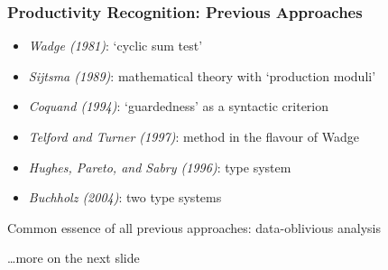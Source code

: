 \documentclass[10pt]{beamer}
\begin{document}
\begin{frame}%
  \frametitle{Productivity Recognition: Previous Approaches}

\begin{itemize}
  \item \emph{Wadge (1981)}: `cyclic sum test'
    \vspace*{0.75ex}
  \item \emph{Sijtsma (1989)}: mathematical theory %
    with `production moduli' 
    \vspace*{0.75ex}
  \item \emph{Coquand (1994)}: `guardedness' as a syntactic criterion
    \vspace*{0.75ex}
  \item \emph{Telford and Turner (1997)}: method in the flavour of Wadge %
    \vspace*{0.75ex}
  \item \emph{Hughes, Pareto, and Sabry (1996)}: type system
    \vspace*{0.75ex}
  \item \emph{Buchholz (2004)}: two type systems %
\end{itemize}

\alert{Common essence} of all previous approaches: \alert{data-oblivious analysis}

\hfill{\ldots more on the next slide}
\end{frame}%
\end{document}
